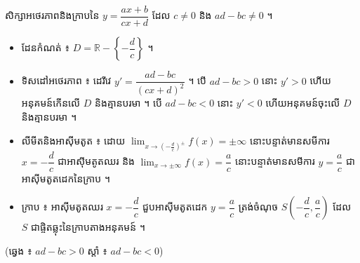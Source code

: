 \begin{center}
\end{center}

\begin{formulaBox}[ករណីទូទៅ]
សិក្សាអថេរភាពនិងក្រាបនៃ $y = \dfrac{ax + b}{cx + d}$ ដែល $c \ne 0$ និង $ad - bc \ne 0$ ។
\begin{itemize}
  \item ដែនកំណត់ ៖ $D = \mathbb{R} - \left\{-\dfrac{d}{c}\right\}$ ។
  \item ទិសដៅអថេរភាព ៖ ដេរីវេ $y' = \dfrac{ad - bc}{(cx + d)^2}$ ។ បើ $ad - bc > 0$ នោះ $y' > 0$ ហើយអនុគមន៍កើនលើ $D$ និងគ្មានបរមា ។ បើ $ad - bc < 0$ នោះ $y' < 0$ ហើយអនុគមន៍ចុះលើ $D$ និងគ្មានបរមា ។
  \item លីមីតនិងអាស៊ីមតូត ៖ ដោយ $\displaystyle\lim_{x \to (-\frac{d}{c})^{\pm}} f(x) = \pm\infty$ នោះបន្ទាត់មានសមីការ $x = -\dfrac{d}{c}$ ជាអាស៊ីមតូតឈរ និង $\displaystyle\lim_{x \to \pm\infty} f(x) = \dfrac{a}{c}$ នោះបន្ទាត់មានសមីការ $y = \dfrac{a}{c}$ ជាអាស៊ីមតូតដេកនៃក្រាប ។
  \item ក្រាប ៖ អាស៊ីមតូតឈរ $x = -\dfrac{d}{c}$ ជួបអាស៊ីមតូតដេក $y = \dfrac{a}{c}$ ត្រង់ចំណុច $S\left(-\dfrac{d}{c}, \dfrac{a}{c}\right)$ ដែល $S$ ជាផ្ចិតឆ្លុះនៃក្រាបតាងអនុគមន៍ ។
\end{itemize}
\end{formulaBox}

\begin{center}
\quad
{}

\small (ឆ្វេង ៖ $ad - bc > 0$ \qquad ស្ដាំ ៖ $ad - bc < 0$)
\end{center}

